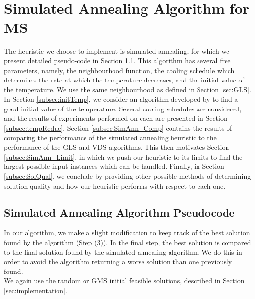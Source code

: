 \documentclass[12pt,a4paper,reqno]{article}
\begin{document}
\newpage
\section{Simulated Annealing Algorithm for MS}
\label{sec:simulatedannealing}

The heuristic we choose to implement is simulated annealing, for which we present detailed pseudo-code in Section \ref{subsec:SA_pseudo}. This algorithm has several free parameters, namely, the neighbourhood function, the cooling schedule which determines the rate at which the temperature decreases, and the initial value of the temperature. We use the same neighbourhood as defined in Section \ref{sec:GLS}. \\

In Section \ref{subsec:initTemp}, we consider an algorithm developed by \citet{ameur2004} to find a good initial value of the temperature. Several cooling schedules are considered, and the results of experiments performed on each are presented in Section \ref{subsec:tempReduc}. Section \ref{subsec:SimAnn_Comp} contains the results of comparing the performance of the simulated annealing heuristic to the performance of the GLS and VDS algorithms. This then motivates Section \ref{subsec:SimAnn_Limit}, in which we push our heuristic to its limits to find the largest possible input instances which can be handled. Finally, in Section \ref{subsec:SolQual}, we conclude by providing other possible methods of determining solution quality and how our heuristic performs with respect to each one.

\subsection{Simulated Annealing Algorithm Pseudocode}
\label{subsec:SA_pseudo}
In our algorithm, we make a slight modification to keep track of the best solution found by the algorithm (Step (3)). In the final step, the best solution is compared to the final solution found by the simulated annealing algorithm. We do this in order to avoid the algorithm returning a worse solution than one previously found. \\

We again use the random or GMS initial feasible solutions, described in Section \ref{sec:implementation}. \\
\end{document}
